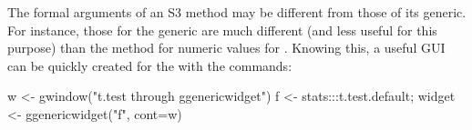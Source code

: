 The formal arguments of an S3 method may be different from those of
its generic. For instance, those for the  generic are
much different (and less useful for this purpose) than the
 method for numeric values for . Knowing
this, a useful GUI can be quickly created for the  with
the commands:
\begin{Schunk}
\begin{Sinput}
 w <- gwindow("t.test through ggenericwidget")
 f <- stats:::t.test.default; 
 widget <- ggenericwidget("f", cont=w)
\end{Sinput}
\end{Schunk}










